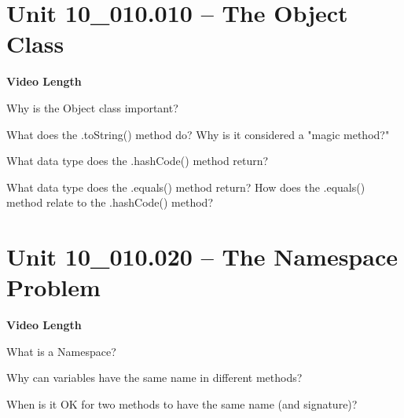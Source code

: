 \documentclass[letterpaper,12pt]{exam}
\newcommand{\unit}{Unit 10}
\begin{document}
\section*{\unit\_010.010 -- The Object Class} 
\par{\selectfont\textbf{Video Length }}
\begin{questions}
\begin{samepage}
    \question Why is the Object class important?
    \vspace{5mm}
\end{samepage}
\begin{samepage}
    \question What does the .toString() method do?  Why is it considered a "magic method?"
    \vspace{5mm}
\end{samepage}

\begin{samepage}
    \question What data type does the .hashCode() method return?
    \vspace{5mm}
\end{samepage}

\begin{samepage}
    \question What data type does the .equals() method return?  How does the .equals() method relate to the .hashCode() method?
    \vspace{5mm}
\end{samepage}

\section*{\unit\_010.020 -- The Namespace Problem} 
\par{\selectfont\textbf{Video Length }}

\begin{samepage}
    \question What is a Namespace?
    \vspace{5mm}
\end{samepage}

\begin{samepage}
    \question Why can variables have the same name in different methods?
    \vspace{5mm}
\end{samepage}

\begin{samepage}
    \question When is it OK for two methods to have the same name (and signature)?
    \vspace{5mm}
\end{samepage}


\end{questions}
\end{document}
